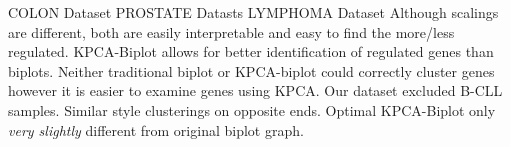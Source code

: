 \documentclass[serif]{beamer}
\begin{document}
	\begin{frame}[t]

		\begin{block}
		{
			\only<1-2>
			{
				COLON Dataset
			}
			\only<3>
			{
				PROSTATE Datasts
			}
			\only<4-5>
			{
				LYMPHOMA Dataset
			}
		}
		{
			\only<1>
			{
				Although scalings are different, both are easily interpretable
				and easy to find the more/less regulated.
			}
			\only<2>
			{
				KPCA-Biplot allows for better identification of regulated genes than biplots.
			}
			\only<3>
			{
				Neither traditional biplot or KPCA-biplot could correctly cluster
				genes however it is easier to examine genes using KPCA.
			}
			\only<4>
			{
				Our dataset excluded B-CLL samples. Similar style clusterings on
				opposite ends.
			}
			\only<5>
			{
				Optimal KPCA-Biplot only \emph{very slightly} different from original biplot graph.
			}
		}	
		\end{block}

		\begin{columns}
			\begin{column}{1.75in}
				\vspace{-1.00in}
				

\end{column}
\end{columns}
\end{frame}
\end{document}
